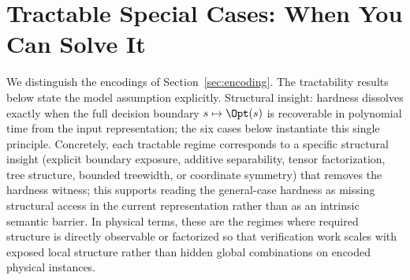 \section{Tractable Special Cases: When You Can Solve It}\label{sec:tractable}

We distinguish the encodings of Section~\ref{sec:encoding}. The tractability results below state the model assumption explicitly.
Structural insight: hardness dissolves exactly when the full decision boundary $s \mapsto \Opt(s)$ is recoverable in polynomial time from the input representation; the six cases below instantiate this single principle.
Concretely, each tractable regime corresponds to a specific structural insight (explicit boundary exposure, additive separability, tensor factorization, tree structure, bounded treewidth, or coordinate symmetry) that removes the hardness witness; this supports reading the general-case hardness as missing structural access in the current representation rather than as an intrinsic semantic barrier.
In physical terms, these are the regimes where required structure is directly observable or factorized so that verification work scales with exposed local structure rather than hidden global combinations on encoded physical instances.


